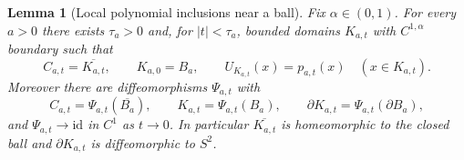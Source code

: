 \documentclass[11pt]{article}
\newtheorem{lemma}[theorem]{Lemma}
\theoremstyle{definition}
\theoremstyle{remark}
\newcommand{\1}{\mathbf{1}}
\begin{document}
\begin{lemma}[Local polynomial inclusions near a ball]\label{lem:local}
Fix $\alpha\in(0,1)$. For every $a>0$ there exists $\tau_a>0$ and, for $|t|<\tau_a$, bounded domains $K_{a,t}$ with $C^{1,\alpha}$ boundary such that
\begin{equation}\label{eq:localconclusions}
 C_{a,t}=\overline{K_{a,t}},\qquad
 K_{a,0}=B_a,
 \qquad
 U_{K_{a,t}}(x)=p_{a,t}(x)\quad(x\in K_{a,t}).
\end{equation}
Moreover there are diffeomorphisms $\Psi_{a,t}$ with
\begin{equation}\label{eq:diffeo}
 C_{a,t}=\Psi_{a,t}(\overline{B_a}),\qquad
 K_{a,t}=\Psi_{a,t}(B_a),\qquad
 \partial K_{a,t}=\Psi_{a,t}(\partial B_a),
\end{equation}
and $\Psi_{a,t}\to\mathrm{id}$ in $C^1$ as $t\to0$. In particular $\overline{K_{a,t}}$ is homeomorphic to the closed ball and $\partial K_{a,t}$ is diffeomorphic to $S^2$.
\end{lemma}
\end{document}
